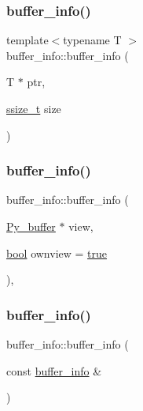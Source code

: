 \subsubsection{\texorpdfstring{buffer\_info()}{buffer\_info()}\hspace{0.1cm}{\footnotesize\ttfamily [5/8]}}
{\footnotesize\ttfamily template$<$typename T $>$ \\
buffer\+\_\+info\+::buffer\+\_\+info (\begin{DoxyParamCaption}\item[{T $\ast$}]{ptr,  }\item[{\mbox{\hyperlink{detail_2common_8h_ac430d16fc097b3bf0a7469cfd09decda}{ssize\+\_\+t}}}]{size }\end{DoxyParamCaption})\hspace{0.3cm}{\ttfamily [inline]}}

\mbox{\label{structbuffer__info_a18bf6023b6d4bb685d345d5acb9b71ca}} 
\subsubsection{\texorpdfstring{buffer\_info()}{buffer\_info()}\hspace{0.1cm}{\footnotesize\ttfamily [6/8]}}
{\footnotesize\ttfamily buffer\+\_\+info\+::buffer\+\_\+info (\begin{DoxyParamCaption}\item[{\mbox{\hyperlink{_python27_2object_8h_a0c1c5dc66cfb07c46b863b5186f61cf4}{Py\+\_\+buffer}} $\ast$}]{view,  }\item[{\mbox{\hyperlink{asdl_8h_af6a258d8f3ee5206d682d799316314b1}{bool}}}]{ownview = {\ttfamily \mbox{\hyperlink{asdl_8h_af6a258d8f3ee5206d682d799316314b1a08f175a5505a10b9ed657defeb050e4b}{true}}} }\end{DoxyParamCaption})\hspace{0.3cm}{\ttfamily [inline]}, {\ttfamily [explicit]}}

\mbox{\label{structbuffer__info_a7c5a7e3878ecda87f0e60448b2bf7d1e}} 
\subsubsection{\texorpdfstring{buffer\_info()}{buffer\_info()}\hspace{0.1cm}{\footnotesize\ttfamily [7/8]}}
{\footnotesize\ttfamily buffer\+\_\+info\+::buffer\+\_\+info (\begin{DoxyParamCaption}\item[{const \mbox{\hyperlink{structbuffer__info}{buffer\+\_\+info}} \&}]{ }\end{DoxyParamCaption})\hspace{0.3cm}{\ttfamily [delete]}}

